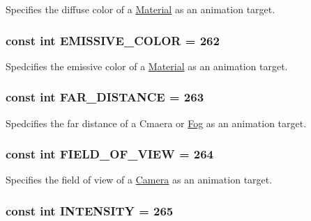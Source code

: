 Specifies the diffuse color of a \hyperlink{classm3g_1_1Material}{Material} as an animation target. \hypertarget{classm3g_1_1AnimationTrack_893461d45d084e5db05b159068f945d0}{
\subsubsection[{EMISSIVE\_\-COLOR}]{\setlength{\rightskip}{0pt plus 5cm}const int {\bf EMISSIVE\_\-COLOR} = 262}}
\label{classm3g_1_1AnimationTrack_893461d45d084e5db05b159068f945d0}


Spedcifies the emissive color of a \hyperlink{classm3g_1_1Material}{Material} as an animation target. \hypertarget{classm3g_1_1AnimationTrack_86457ec0a2799f1f2d7ea8173a644de8}{
\subsubsection[{FAR\_\-DISTANCE}]{\setlength{\rightskip}{0pt plus 5cm}const int {\bf FAR\_\-DISTANCE} = 263}}
\label{classm3g_1_1AnimationTrack_86457ec0a2799f1f2d7ea8173a644de8}


Spedcifies the far distance of a Cmaera or \hyperlink{classm3g_1_1Fog}{Fog} as an animation target. \hypertarget{classm3g_1_1AnimationTrack_94c1c1d2f7d48b52e3c2bcd332ed3937}{
\subsubsection[{FIELD\_\-OF\_\-VIEW}]{\setlength{\rightskip}{0pt plus 5cm}const int {\bf FIELD\_\-OF\_\-VIEW} = 264}}
\label{classm3g_1_1AnimationTrack_94c1c1d2f7d48b52e3c2bcd332ed3937}


Specifies the field of view of a \hyperlink{classm3g_1_1Camera}{Camera} as an animation target. \hypertarget{classm3g_1_1AnimationTrack_369fe8830f39fe4aec819a371a6c9904}{
\subsubsection[{INTENSITY}]{\setlength{\rightskip}{0pt plus 5cm}const int {\bf INTENSITY} = 265}}
\label{classm3g_1_1AnimationTrack_369fe8830f39fe4aec819a371a6c9904}


